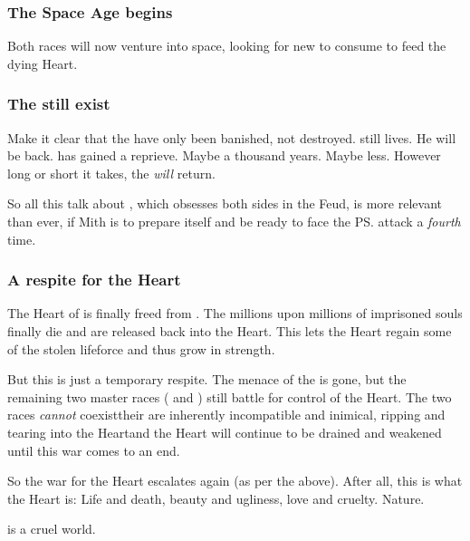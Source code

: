 \subsubsection{The Space Age begins}
Both races will now venture into space, looking for new \dweomers{} to consume to feed the dying Heart. 




\subsubsection{The \banes{} still exist}
Make it clear that the \banes{} have only been banished, not destroyed. 
\Daggerrain{} still lives. 
He will be back. 
\Miith{} has gained a reprieve. 
Maybe a thousand years. 
Maybe less.
However long or short it takes, the \banes{} \emph{will} return. 

So all this talk about , which obsesses both sides in the Feud, is more relevant than ever, if Mith is to prepare itself and be ready to face the \ps{\Voidbringer} attack a \emph{fourth} time. 






\subsubsection{A respite for the Heart}
The Heart of \Miith{} is finally freed from . 
The millions upon millions of imprisoned souls finally die and are released back into the Heart. 
This lets the Heart regain some of the stolen lifeforce and thus grow in strength. 

But this is just a temporary respite. 
The menace of the \banes{} is gone, but the remaining two master races (\dragons{} and \resphain) still battle for control of the Heart. 
The two races \emph{cannot} coexist\dash their \matrices{} are inherently incompatible and inimical, ripping and tearing into the Heart\dash and the Heart will continue to be drained and weakened until this war comes to an end. 

So the war for the Heart escalates again (as per the  above). 
After all, this is what the Heart is: 
Life and death, beauty and ugliness, love and cruelty. 
Nature. 

\Miith{} is a cruel world. 





